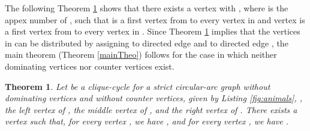 \documentclass[10pt]{article}
\newtheorem{theorem}{Theorem}[section]
\begin{document}
The following Theorem \ref{separator} shows that there 
exists a vertex  with , where  is 
the appex number of , such that  is a 
first vertex from  to every vertex in  and vertex  is a 
first vertex from  to every vertex in . 
Since Theorem \ref{separator} implies that the vertices in  can be distributed 
by assigning  to directed edge  and  to directed edge , the main theorem 
(Theorem \ref{mainTheo}) 
follows for the case in which neither dominating vertices nor counter vertices exist.











\begin{theorem}\label{separator}
Let  be a clique-cycle for a strict circular-arc graph  without 
dominating vertices and without counter vertices,  given by 
Listing \ref{fig:animals}, ,   the left 
vertex of ,  the middle vertex of , and  the right vertex of .
There exists a vertex  such that, for 
every vertex , we have , and 
for every vertex , 
we have .
\end{theorem}
\end{document}
